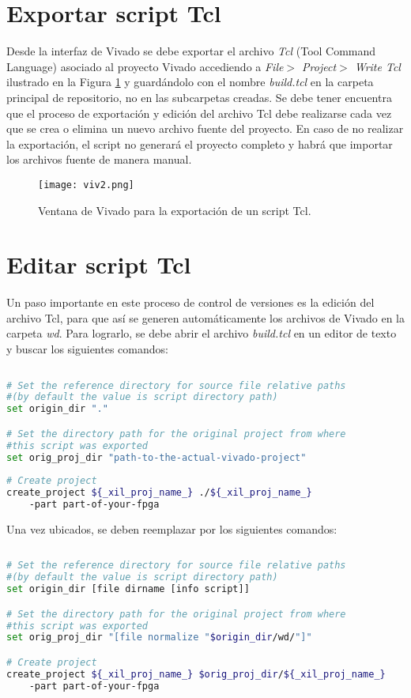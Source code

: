 \section{Exportar script Tcl}

	Desde la interfaz de Vivado se debe exportar el archivo \textit{Tcl} (Tool Command Language) asociado al proyecto Vivado accediendo a \textit{File$>$ Project$>$ Write Tcl} ilustrado en la Figura \ref{fig:viv2} y guardándolo con el nombre \textit{build.tcl} en la carpeta principal de repositorio, no en las subcarpetas creadas. Se debe tener encuentra que el proceso de exportación y edición del archivo Tcl debe realizarse cada vez que se crea o elimina un nuevo archivo fuente del proyecto. En caso de no realizar la exportación, el script no generará el proyecto completo y habrá que importar los archivos fuente de manera manual.
	
	\begin{figure}[ht]
		\centering
		\texttt{[image: viv2.png]}
		\caption{Ventana de Vivado para la exportación de un script Tcl.}
		\label{fig:viv2}
	\end{figure}

\section{Editar script Tcl}
	Un paso importante en este proceso de control de versiones es la edición del archivo Tcl, para que así se generen automáticamente los archivos de Vivado en la carpeta \textit{wd}. Para lograrlo, se debe abrir el archivo \textit{build.tcl} en un editor de texto y buscar los siguientes comandos:

\begin{lstlisting}[language=bash, frame=single, basicstyle=\small]
	
# Set the reference directory for source file relative paths 
#(by default the value is script directory path)
set origin_dir "."

# Set the directory path for the original project from where
#this script was exported
set orig_proj_dir "path-to-the-actual-vivado-project"
	
# Create project
create_project ${_xil_proj_name_} ./${_xil_proj_name_} 
	-part part-of-your-fpga

\end{lstlisting}

	Una vez ubicados, se deben reemplazar por los siguientes comandos:
	
\begin{lstlisting}[language=bash, frame=single, basicstyle=\small]
	
# Set the reference directory for source file relative paths 
#(by default the value is script directory path)
set origin_dir [file dirname [info script]]

# Set the directory path for the original project from where 
#this script was exported
set orig_proj_dir "[file normalize "$origin_dir/wd/"]"

# Create project
create_project ${_xil_proj_name_} $orig_proj_dir/${_xil_proj_name_} 
	-part part-of-your-fpga

\end{lstlisting}


